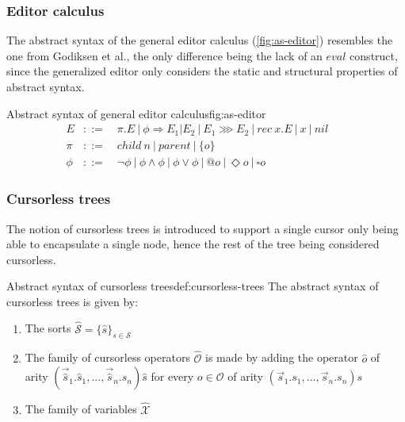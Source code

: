 \subsubsection{Editor calculus}
The abstract syntax of the general editor calculus (\cref{fig:as-editor}) resembles the one from Godiksen et al., the only difference being the lack of an $eval$ construct, since the generalized editor only considers the static and structural properties of abstract syntax.

\begin{myfigure}{Abstract syntax of general editor calculus}{fig:as-editor}
    \[
        \begin{aligned}
            E    & ::= \quad \pi.E \ | \ \phi \Rightarrow E_1|E_2 \ | \ E_1 \ggg E_2 \ | \ rec \ x.E \ | \ x \ | \ nil      &  & \\
            \pi  & ::= \quad child \ n \ | \ parent \ | \ \{ o \}                                                           &  & \\
            \phi & ::= \quad \neg \phi \ | \ \phi \land \phi \ | \ \phi \lor \phi \ | \ @o \ | \ \Diamond o \ | \ \square o
        \end{aligned}
    \]
\end{myfigure}

\subsubsection{Cursorless trees}
The notion of cursorless trees is introduced to support a single cursor only being
able to encapsulate a single node, hence the rest of the tree being 
considered cursorless.

\begin{definition}{Abstract syntax of cursorless trees}{def:cursorless-trees}
    The abstract syntax of cursorless trees is given by:
    \begin{enumerate}
        \item The sorts $\hat{\mathcal{S}} = \{ \hat{s} \}_{s \in \mathcal{S}}$
        \item The family of cursorless operators $\hat{\mathcal{O}}$ is made by adding
        the operator $\hat{o}$ of arity 
        $(\vec{\hat{s}}_1.\hat{s}_1,...,\vec{\hat{s}}_n.\hat{s}_n)\hat{s}$
        for every $o \in \mathcal{O}$ of arity $(\vec{s}_1.s_1,...,\vec{s}_n.s_n)s$
        \item The family of variables $\hat{\mathcal{X}}$
    \end{enumerate}
\end{definition}

